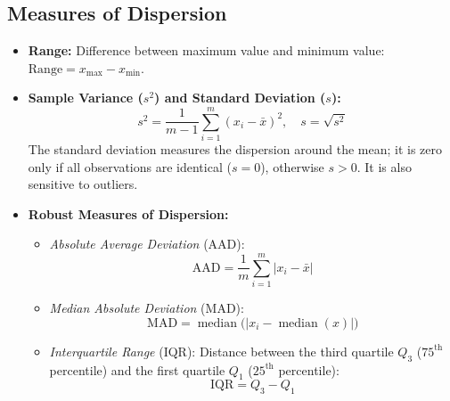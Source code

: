 \subsection{Measures of Dispersion}
\begin{itemize}
    \item \textbf{Range:} Difference between maximum value and minimum value: $\text{Range} = x_{\max} - x_{\min}$.
    \item \textbf{Sample Variance ($s^2$) and Standard Deviation ($s$):}
    \begin{equation}
    s^2 = \frac{1}{m-1} \sum_{i=1}^m (x_i - \bar{x})^2, \quad s = \sqrt{s^2}
    \end{equation}
    The standard deviation measures the dispersion around the mean; it is zero only if all observations are identical ($s=0$), otherwise $s > 0$. It is also sensitive to outliers.
    \item \textbf{Robust Measures of Dispersion:}
    \begin{itemize}
        \item \textit{Absolute Average Deviation} (AAD):
        \begin{equation}
        \text{AAD} = \frac{1}{m} \sum_{i=1}^m |x_i - \bar{x}|
        \end{equation}
        \item \textit{Median Absolute Deviation} (MAD):
        \begin{equation}
        \text{MAD} = \operatorname{median}\big(|x_i - \operatorname{median}(x)|\big)
        \end{equation}
        \item \textit{Interquartile Range} (IQR): Distance between the third quartile $Q_3$ ($75^{\text{th}}$ percentile) and the first quartile $Q_1$ ($25^{\text{th}}$ percentile):
        \begin{equation}
        \text{IQR} = Q_3 - Q_1
        \end{equation}
    \end{itemize}
\end{itemize}

